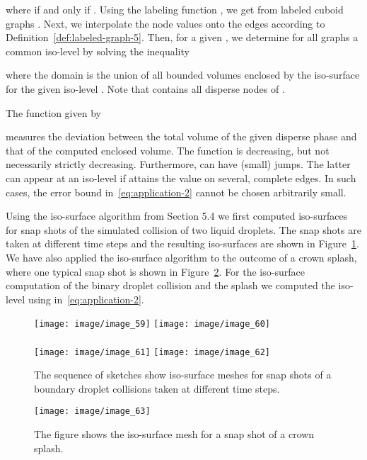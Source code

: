 \documentclass[a4paper,11pt]{article}
\begin{document}
where  if and only if . Using the labeling function , we get from
 labeled cuboid graphs .
Next, we interpolate the node values onto the edges according to \mbox{Definition}~\ref{def:labeled-graph-5}. Then, for
a given , we determine for all graphs  a common iso-level  by solving the
inequality

where the domain  is the union of all bounded volumes enclosed by
the iso-surface for the given iso-level . Note that  contains all disperse nodes
of .

The function  given by

measures the deviation between the total volume of the given disperse phase and that of the computed
enclosed volume. The function  is decreasing, but not necessarily strictly decreasing.
Furthermore,  can have (small) jumps. The latter can appear at an iso-level  if
 attains the value  on several, complete edges. In such cases, the error bound 
in~\eqref{eq:application-2} cannot be chosen arbitrarily small.

Using the iso-surface algorithm from Section 5.4 we first computed iso-surfaces for snap shots of the
simulated collision of two liquid droplets. The snap shots are taken at different time steps and the
resulting iso-surfaces are shown in Figure~\ref{image_59_60_61_62}. We have also applied the
iso-surface algorithm to the outcome of a crown splash, where one typical snap shot is shown in
Figure~\ref{image_63}. For the iso-surface computation of the binary droplet collision and
the splash we computed the iso-level  using  in~\eqref{eq:application-2}.
\begin{figure}[!ht]
\texttt{[image: image/image\_59]}\hspace{1cm}
\texttt{[image: image/image\_60]}\\ \\
\texttt{[image: image/image\_61]}\hspace{1cm}
\texttt{[image: image/image\_62]}
\caption{The sequence of sketches show iso-surface meshes for snap shots of a boundary droplet collisions taken at different
time steps.}
\label{image_59_60_61_62}
\end{figure}
\begin{figure}[!ht]
\texttt{[image: image/image\_63]}
\caption{The figure shows the iso-surface mesh for a snap shot of a crown splash.}
\label{image_63}
\end{figure}
\FloatBarrier
\end{document}
